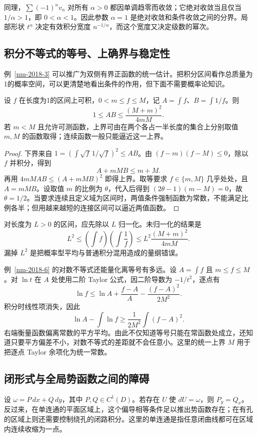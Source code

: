 \documentclass[12pt,fontset=fandol]{ctexart}
\begin{document}
同理，$\sum(-1)^nv_n$ 对所有 $\alpha>0$ 都因单调趋零而收敛；它绝对收敛当且仅当 $1/\alpha>1$，即 $0<\alpha<1$。因此参数 $\alpha=1$ 是绝对收敛和条件收敛之间的分界。局部形状 $t^\alpha$ 决定有效积分宽度 $n^{-1/\alpha}$，而这个宽度又决定级数的幂次。

\subsection{积分不等式的等号、上确界与稳定性}
例~\ref{nm-2018-3} 可以推广为双侧有界正函数的统一估计。把积分区间看作总质量为1的概率空间，可以更清楚地看出条件的作用，但下面不需要概率论知识。

\begin{theorem}[正函数与倒数的积分乘积]\label{supp-kantorovich}
设 $f$ 在长度为1的区间上可积，$0<m\leq f\leq M$，记 $A=\int f$、$B=\int1/f$。则
\[
 1\leq AB\leq\frac{(M+m)^2}{4mM}.
\]
若 $m<M$ 且允许可测函数，上界可由在两个各占一半长度的集合上分别取值 $m,M$ 的函数取得；连续函数一般只能逼近这一上界。
\end{theorem}
\begin{proof}
下界来自 $1=(\int\sqrt f\,1/\sqrt f)^2\leq AB$。由 $(f-m)(f-M)\leq0$，除以 $f$ 并积分，得到
\[
 A+mMB\leq m+M.
\]
再用 $4mMAB\leq(A+mMB)^2$ 即得上界。取等要求 $f\in\{m,M\}$ 几乎处处，且 $A=mMB$。设取值 $m$ 的比例为 $\theta$，代入后得到 $(2\theta-1)(m-M)=0$，故 $\theta=1/2$。当要求连续且定义域为区间时，两值条件强制函数为常数，不能满足比例各半；但用越来越短的连接区间可以逼近两值函数。
\end{proof}

对长度为 $L>0$ 的区间，应先除以 $L$ 归一化。未归一化的结果是
\[
 L^2\leq\left(\int f\right)\left(\int\frac1f\right)
 \leq L^2\frac{(M+m)^2}{4mM}.
\]
漏掉 $L^2$ 是把概率型平均与普通积分混用造成的量纲错误。

例~\ref{nm-2018-6} 的对数不等式还能量化离等号有多远。设 $A=\int f$ 且 $m\leq f\leq M$。对 $\ln t$ 在 $A$ 处使用二阶 Taylor 公式，因二阶导数为 $-1/t^2$，逐点有
\[
 \ln f\leq\ln A+\frac{f-A}{A}-\frac{(f-A)^2}{2M^2}.
\]
积分时线性项消失，因此
\[
 \ln A-\int\ln f\geq\frac1{2M^2}\int(f-A)^2.
\]
右端衡量函数偏离常数的平方平均。由此不仅知道等号只能在常函数处成立，还知道只要平方偏差不小，对数不等式的差距就不会任意小。这里的统一上界 $M$ 用于把逐点 Taylor 余项化为统一常数。

\subsection{闭形式与全局势函数之间的障碍}
设 $\omega=P\,dx+Q\,dy$，其中 $P,Q\in C^1(D)$。若存在 $U$ 使 $dU=\omega$，则 $P_y=Q_x$。反过来，在单连通的平面区域上，这个偏导相等条件足以推出势函数存在；在有孔的区域上则还需要控制绕孔的闭路积分。这里的单连通是指任意闭曲线都可在区域内连续收缩为一点。
\end{document}
